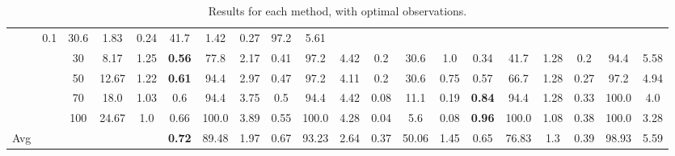 \documentclass[letterpaper]{article}
\begin{document}
\begin{table*}[]
\begin{tabular}{|c|c|ccc|ccc|ccc|ccc|ccc|ccc|}
		& 0.1 & 30.6 & 1.83 	 

		& 0.24 & 41.7 & 1.42 	 

		& 0.27 & 97.2 & 5.61 	 

	\\ & & 30	 & 8.17	 & 1.25

		& \textbf{0.56} & 77.8 & 2.17 	 

		& 0.41 & 97.2 & 4.42 	 

		& 0.2 & 30.6 & 1.0 	 

		& 0.34 & 41.7 & 1.28 	 

		& 0.2 & 94.4 & 5.58 	 

	\\ & & 50	 & 12.67	 & 1.22

		& \textbf{0.61} & 94.4 & 2.97 	 

		& 0.47 & 97.2 & 4.11 	 

		& 0.2 & 30.6 & 0.75 	 

		& 0.57 & 66.7 & 1.28 	 

		& 0.27 & 97.2 & 4.94 	 

	\\ & & 70	 & 18.0	 & 1.03

		& 0.6 & 94.4 & 3.75 	 

		& 0.5 & 94.4 & 4.42 	 

		& 0.08 & 11.1 & 0.19 	 

		& \textbf{0.84} & 94.4 & 1.28 	 

		& 0.33 & 100.0 & 4.0 	 

	\\ & & 100	 & 24.67	 & 1.0

		& 0.66 & 100.0 & 3.89 	 

		& 0.55 & 100.0 & 4.28 	 

		& 0.04 & 5.6 & 0.08 	 

		& \textbf{0.96} & 100.0 & 1.08 	 

		& 0.38 & 100.0 & 3.28 	 
 \\ \hline
Avg & & & &  & \textbf{0.72} & 89.48 & 1.97 & 0.67 & 93.23 & 2.64 & 0.37 & 50.06 & 1.45 & 0.65 & 76.83 & 1.3 & 0.39 & 98.93 & 5.59
\\ \hline
\end{tabular}
\caption{Results for each method, with optimal observations.}
\end{table*}
\end{document}
